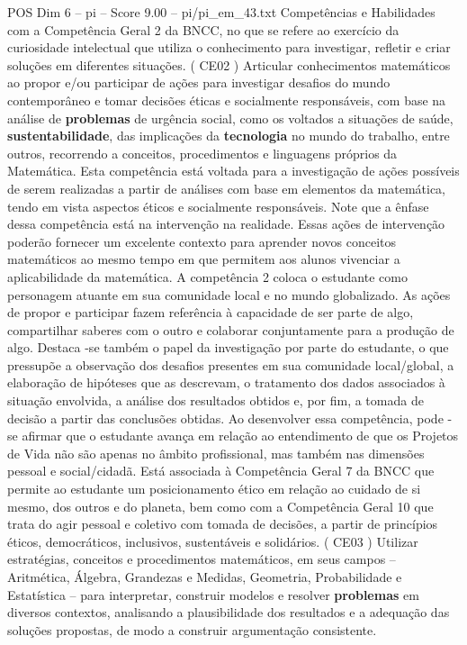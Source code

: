 \begin{textsample}{POS Dim 6 – pi – Score 9.00 – pi/pi\_em\_43.txt}  \label{ex:f6_pos_192}
Competências e Habilidades com a Competência Geral 2 da BNCC, no que se refere ao exercício da curiosidade intelectual que utiliza o conhecimento para investigar, refletir e criar soluções em diferentes situações. ( CE02 ) Articular conhecimentos matemáticos ao propor e/ou participar de ações para investigar desafios do mundo contemporâneo e tomar decisões éticas e socialmente responsáveis, com base na análise de \textbf{problemas} de urgência social, como os voltados a situações de saúde, \textbf{sustentabilidade}, das implicações da \textbf{tecnologia} no mundo do trabalho, entre outros, recorrendo a conceitos, procedimentos e linguagens próprios da Matemática.
Esta competência está voltada para a investigação de ações possíveis de serem realizadas a partir de análises com base em elementos da matemática, tendo em vista aspectos éticos e socialmente responsáveis.
Note que a ênfase dessa competência está na intervenção na realidade.
Essas ações de intervenção poderão fornecer um excelente contexto para aprender novos conceitos matemáticos ao mesmo tempo em que permitem aos alunos vivenciar a aplicabilidade da matemática.
A competência 2 coloca o estudante como personagem atuante em sua comunidade local e no mundo globalizado.
As ações de propor e participar fazem referência à capacidade de ser parte de algo, compartilhar saberes com o outro e colaborar conjuntamente para a produção de algo.
Destaca -se também o papel da investigação por parte do estudante, o que pressupõe a observação dos desafios presentes em sua comunidade local/global, a elaboração de hipóteses que as descrevam, o tratamento dos dados associados à situação envolvida, a análise dos resultados obtidos e, por fim, a tomada de decisão a partir das conclusões obtidas.
Ao desenvolver essa competência, pode -se afirmar que o estudante avança em relação ao entendimento de que os Projetos de Vida não são apenas no âmbito profissional, mas também nas dimensões pessoal e social/cidadã.
Está associada à Competência Geral 7 da BNCC que permite ao estudante um posicionamento ético em relação ao cuidado de si mesmo, dos outros e do planeta, bem como com a Competência Geral 10 que trata do agir pessoal e coletivo com tomada de decisões, a partir de princípios éticos, democráticos, inclusivos, sustentáveis e solidários. ( CE03 ) Utilizar estratégias, conceitos e procedimentos matemáticos, em seus campos – Aritmética, Álgebra, Grandezas e Medidas, Geometria, Probabilidade e Estatística – para interpretar, construir modelos e resolver \textbf{problemas} em diversos contextos, analisando a plausibilidade dos resultados e a adequação das soluções propostas, de modo a construir argumentação consistente.

\end{textsample}
